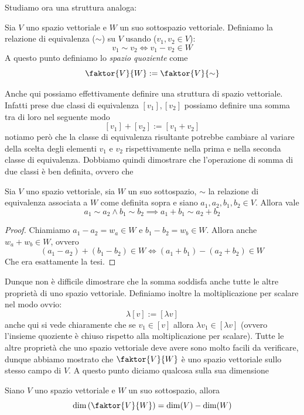 \documentclass[11pt]{scrartcl}
\begin{document}
	Studiamo ora una struttura analoga:
	\begin{definition}
		Sia $V$ uno spazio vettoriale e $W$ un suo sottospazio vettoriale. Definiamo la relazione di equivalenza ($\sim$) su $V$ usando ($v_1,v_2\in V$):
		$$v_1 \sim v_2 \iff v_1-v_2\in W$$
		A questo punto definiamo lo \textit{spazio quoziente} come
		$$\faktor{V}{W}:=\faktor{V}{\sim}$$
	\end{definition}
	Anche qui possiamo effettivamente definire una struttura di spazio vettoriale. Infatti prese due classi di equivalenza $[v_1],[v_2]$ possiamo definire una somma tra di loro nel seguente modo
	$$[v_1]+[v_2]:=[v_1+v_2]$$
	notiamo però che la classe di equivalenza risultante potrebbe cambiare al variare della scelta degli elementi $v_1$ e $v_2$ rispettivamente nella prima e nella seconda classe di equivalenza. Dobbiamo quindi dimostrare che l'operazione di somma di due classi è ben definita, ovvero che 
	\begin{lemma}
		Sia $V$ uno spazio vettoriale, sia $W$ un suo sottospazio, $\sim$ la relazione di equivalenza associata a $W$ come definita sopra e siano $a_1,a_2,b_1,b_2\in V$. Allora vale 
		$$a_1\sim a_2 \land b_1\sim b_2 \implies a_1 + b_1 \sim a_2+ b_2$$
	\end{lemma}
	\begin{proof}
		Chiamiamo $a_1-a_2=w_a\in W$ e $b_1-b_2=w_b\in W$. Allora anche $w_a+w_b\in W$, ovvero
		$$(a_1-a_2)+(b_1-b_2)\in W\iff (a_1+b_1)-(a_2+b_2)\in W$$
		Che era esattamente la tesi. 
	\end{proof}
	Dunque non è difficile dimostrare che la somma soddisfa anche tutte le altre proprietà di uno spazio vettoriale. Definiamo inoltre la moltiplicazione per scalare nel modo ovvio:
	$$\lambda[v]:=[\lambda v]$$
	anche qui si vede chiaramente che se $v_1\in[v]$ allora $\lambda v_1 \in [\lambda v]$ (ovvero l'insieme quoziente è chiuso rispetto alla moltiplicazione per scalare). Tutte le altre proprietà che uno spazio vettoriale deve avere sono molto facili da verificare, dunque abbiamo mostrato che $\faktor{V}{W}$ è uno spazio vettoriale sullo stesso campo di $V$. A questo punto diciamo qualcosa sulla sua dimensione
	\begin{lemma}
		Siano $V$ uno spazio vettoriale e $W$ un suo sottospazio, allora
		$$\dim\left(\faktor{V}{W}\right)=\dim(V)-\dim(W)$$
	\end{lemma}
\end{document}
